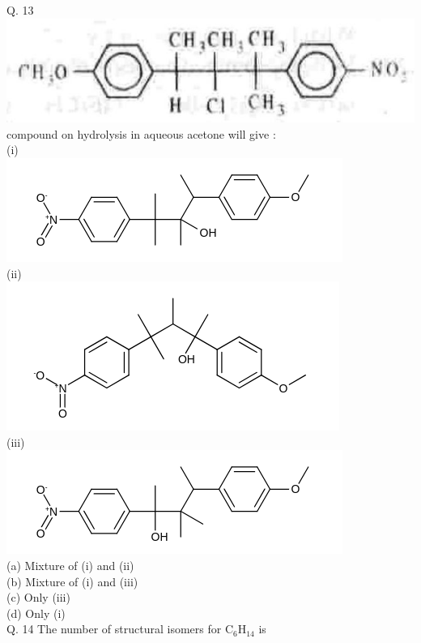 \documentclass[10pt]{article}
\begin{document}
Q. 13\\
\includegraphics[max width=\textwidth, center]{2025_01_28_8470952b98110cec3aabg-154}\\
compound on hydrolysis in aqueous acetone will give :\\
(i)\\
\includegraphics{smile-b64e94b036efbcb0539b91f9e580ae5398c3a51b}\\
(ii)\\
\includegraphics{smile-1f8e083db8c68a5262bb6c16b264c9ec7785723e}\\
(iii)\\
\includegraphics{smile-4b28a2640550673114d6653414e224eca941b30a}\\
(a) Mixture of (i) and (ii)\\
(b) Mixture of (i) and (iii)\\
(c) Only (iii)\\
(d) Only (i)\\
Q. 14 The number of structural isomers for $\mathrm{C}_{6} \mathrm{H}_{14}$ is\\[0pt]
\end{document}
